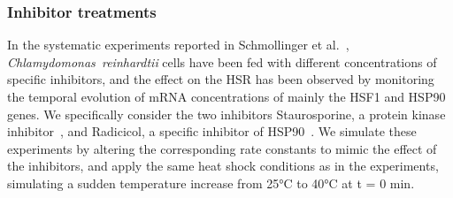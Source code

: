 \documentclass[oneside, 10pt, a4paper, twocolumn]{article}
\begin{document}
\subsubsection{Inhibitor treatments}
\label{SecFeeding}

In the systematic experiments reported in Schmollinger et al.~\cite{Schmollinger2013}, \textit{Chlamydomonas~reinhardtii} cells have been fed
with different concentrations of specific inhibitors, and the effect on the HSR
has been observed by monitoring the temporal evolution of mRNA concentrations
of mainly the HSF1 and HSP90 genes.
We specifically consider the two inhibitors Staurosporine, a protein kinase inhibitor~\cite{Karaman2008}, 
and Radicicol, a specific inhibitor of HSP90~\cite{Roe1999}. 
We simulate these experiments by altering the corresponding rate constants to mimic the effect of 
the inhibitors, and apply the same heat shock conditions as in the experiments,
simulating a sudden temperature increase from 25°C to 40°C at t = 0 min.






\end{document}
